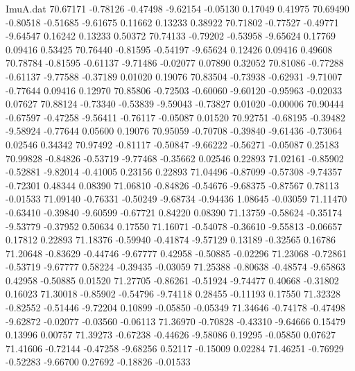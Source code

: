 \begin{filecontents}{ImuA.dat}
  70.67171   -0.78126   -0.47498   -9.62154   -0.05130    0.17049    0.41975
  70.69490   -0.80518   -0.51685   -9.61675    0.11662    0.13233    0.38922
  70.71802   -0.77527   -0.49771   -9.64547    0.16242    0.13233    0.50372
  70.74133   -0.79202   -0.53958   -9.65624    0.17769    0.09416    0.53425
  70.76440   -0.81595   -0.54197   -9.65624    0.12426    0.09416    0.49608
  70.78784   -0.81595   -0.61137   -9.71486   -0.02077    0.07890    0.32052
  70.81086   -0.77288   -0.61137   -9.77588   -0.37189    0.01020    0.19076
  70.83504   -0.73938   -0.62931   -9.71007   -0.77644    0.09416    0.12970
  70.85806   -0.72503   -0.60060   -9.60120   -0.95963   -0.02033    0.07627
  70.88124   -0.73340   -0.53839   -9.59043   -0.73827    0.01020   -0.00006
  70.90444   -0.67597   -0.47258   -9.56411   -0.76117   -0.05087    0.01520
  70.92751   -0.68195   -0.39482   -9.58924   -0.77644    0.05600    0.19076
  70.95059   -0.70708   -0.39840   -9.61436   -0.73064    0.02546    0.34342
  70.97492   -0.81117   -0.50847   -9.66222   -0.56271   -0.05087    0.25183
  70.99828   -0.84826   -0.53719   -9.77468   -0.35662    0.02546    0.22893
  71.02161   -0.85902   -0.52881   -9.82014   -0.41005    0.23156    0.22893
  71.04496   -0.87099   -0.57308   -9.74357   -0.72301    0.48344    0.08390
  71.06810   -0.84826   -0.54676   -9.68375   -0.87567    0.78113   -0.01533
  71.09140   -0.76331   -0.50249   -9.68734   -0.94436    1.08645   -0.03059
  71.11470   -0.63410   -0.39840   -9.60599   -0.67721    0.84220    0.08390
  71.13759   -0.58624   -0.35174   -9.53779   -0.37952    0.50634    0.17550
  71.16071   -0.54078   -0.36610   -9.55813   -0.06657    0.17812    0.22893
  71.18376   -0.59940   -0.41874   -9.57129    0.13189   -0.32565    0.16786
  71.20648   -0.83629   -0.44746   -9.67777    0.42958   -0.50885   -0.02296
  71.23068   -0.72861   -0.53719   -9.67777    0.58224   -0.39435   -0.03059
  71.25388   -0.80638   -0.48574   -9.65863    0.42958   -0.50885    0.01520
  71.27705   -0.86261   -0.51924   -9.74477    0.40668   -0.31802    0.16023
  71.30018   -0.85902   -0.54796   -9.74118    0.28455   -0.11193    0.17550
  71.32328   -0.82552   -0.51446   -9.72204    0.10899   -0.05850   -0.05349
  71.34646   -0.74178   -0.47498   -9.62872   -0.02077   -0.03560   -0.06113
  71.36970   -0.70828   -0.43310   -9.64666    0.15479    0.13996    0.00757
  71.39273   -0.67238   -0.44626   -9.58086    0.19295   -0.05850    0.07627
  71.41606   -0.72144   -0.47258   -9.68256    0.52117   -0.15009    0.02284
  71.46251   -0.76929   -0.52283   -9.66700    0.27692   -0.18826   -0.01533

\end{filecontents}
